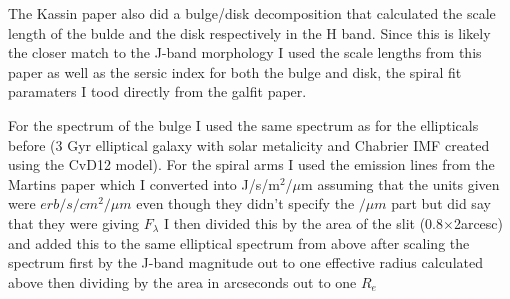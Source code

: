 \documentclass[11pt,twoside]{article}
\begin{document}
The Kassin paper also did a bulge/disk decomposition that calculated the scale length of the bulde and the disk respectively in the H band. Since this is likely the closer match to the J-band morphology I used the scale lengths from this paper as well as the sersic index for both the bulge and disk,  the spiral fit paramaters I tood directly from the galfit paper.

For the spectrum of the bulge I used the same spectrum as for the ellipticals before (3 Gyr elliptical galaxy with solar metalicity and Chabrier IMF created using the CvD12 model). For the spiral arms I used the emission lines from the Martins paper which I converted into J/s/m$^2$/$\mu$m assuming that the units given were $erb/s/cm^2/\mu m$ even though they didn't specify the $/\mu m$ part but did say that they were giving $F_\lambda$ I then divided this by the area of the slit (0.8$\times$2arcesc) and added this to the same elliptical spectrum from above after scaling the spectrum first by the J-band magnitude out to one effective radius calculated above then dividing by the area in arcseconds out to one $R_e$
\end{document}
